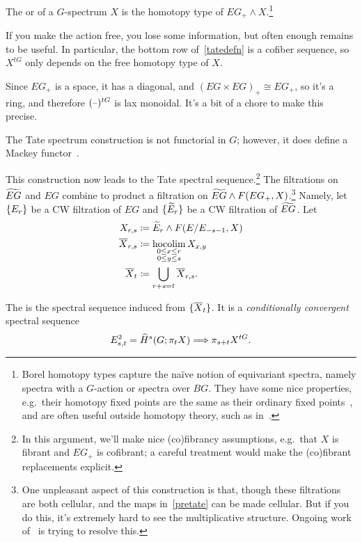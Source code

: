 \begin{defn}
The  or  of a $G$-spectrum $X$ is the homotopy type of
$EG_+\wedge X$.\footnote{Borel homotopy types capture the naïve notion of equivariant spectra, namely spectra with
a $G$-action or spectra over $BG$. They have some nice properties, e.g.\ their homotopy fixed points are the same
as their ordinary fixed points~\cite[Prop.~6.19]{MNN17}, and are often useful outside homotopy theory, such as
in~\cite{FreedHopkins}.}
\end{defn}
If you make the action free, you lose some information, but often enough remains to be useful. In particular, the
bottom row of~\eqref{tatedefn} is a cofiber sequence, so $X^{tG}$ only depends on the free homotopy type of $X$.
\begin{rem}
Since $EG_+$ is a space, it has a diagonal, and $(EG\times EG)_+\cong EG_+$, so it's a ring, and therefore
$(\text{--})^{tG}$ is lax monoidal. It's a bit of a chore to make this precise.

The Tate spectrum construction is not functorial in $G$; however, it does define a Mackey
functor~\cite{GeneralizedTate}.
\end{rem}
This construction now leads to the Tate spectral sequence.\footnote{In this argument, we'll make nice (co)fibrancy
assumptions, e.g.\ that $X$ is fibrant and $EG_+$ is cofibrant; a careful treatment would make the (co)fibrant
replacements explicit.} The filtrations on $\widetilde{EG}$ and $EG$ combine to product a filtration on $\widetilde{EG}\wedge F(EG_+,
X)$.\footnote{One unpleasant aspect of this construction is that, though these filtrations are both cellular, and
the maps in~\eqref{pretate} can be made cellular. But if you do this, it's extremely hard to see the multiplicative
structure. Ongoing work of~ is trying to resolve this.} Namely, let $\{E_r\}$ be a CW
filtration of $EG$ and $\{\widetilde E_r\}$ be a CW filtration of $\widetilde{EG}$. Let
\begin{align*}
	X_{r,s} &\coloneqq \widetilde E_r\wedge F(E/E_{-s-1}, X)\\
	\overline X_{r,s} &\coloneqq \operatorname*{hocolim}_{\substack{0\le x\le r\\0\le y\le s}} X_{x,y}\\
	\overline X_t &\coloneqq \bigcup_{r+s=t} \overline X_{r,s}.
\end{align*}
\begin{defn}
\label{tateSS}
The  is the spectral sequence induced from $\{\overline X_t\}$. It is a
\emph{conditionally convergent} spectral sequence
\[E_{s,t}^2 = \widehat H^s(G; \pi_tX)\Longrightarrow \pi_{s+t}X^{tG}.\]
\end{defn}
